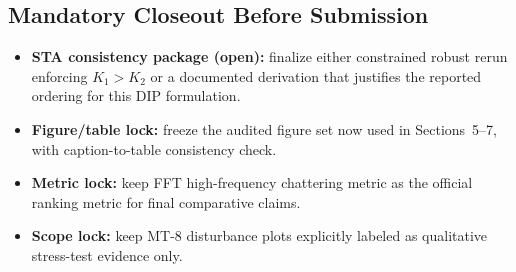 \documentclass[10pt, a4paper]{article}
\begin{document}
\begin{center}
\end{center}

\subsection{Mandatory Closeout Before Submission}
\begin{itemize}[leftmargin=1.5em,itemsep=0.25em]
  \item \textbf{STA consistency package (open):} finalize either constrained
  robust rerun enforcing $K_1 > K_2$ or a documented derivation that justifies
  the reported ordering for this DIP formulation.
  \item \textbf{Figure/table lock:} freeze the audited figure set now used in
  Sections~5--7, with caption-to-table consistency check.
  \item \textbf{Metric lock:} keep FFT high-frequency chattering metric as the
  official ranking metric for final comparative claims.
  \item \textbf{Scope lock:} keep MT-8 disturbance plots explicitly labeled as
  qualitative stress-test evidence only.
\end{itemize}
\end{document}
